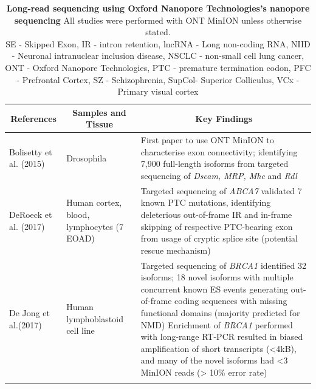 \begin{changemargin}{1.5cm}
\begin{landscape}
		\begin{longtable}[c]{p{4cm}p{4cm}p{18cm}}
			\caption[Long-read sequencing using Oxford Nanopore Technologies's nanopore sequencing]%
			{\textbf{Long-read sequencing using Oxford Nanopore Technologies's nanopore sequencing} All studies were performed with ONT MinION unless otherwise stated. \newline SE - Skipped Exon, IR - intron retention, lncRNA - Long non-coding RNA, NIID - Neuronal intranuclear inclusion disease, NSCLC - non-small cell lung cancer, ONT - Oxford Nanopore Technologies, PTC - premature termination codon, PFC - Prefrontal Cortex, SZ - Schizophrenia, SupCol- Superior Colliculus, VCx - Primary visual cortex}
			\label{tab: longread_ontstudies}\\
			
			\toprule
			\multicolumn{1}{c}{References} &
			\multicolumn{1}{c}{Samples and Tissue} &
			\multicolumn{1}{c}{Key Findings} \\* \midrule
			\endfirsthead
			\endhead
			\bottomrule
			\endfoot
			\endlastfoot
			\centering Bolisetty et al. (2015)\cite{Bolisetty2015} &
			\centering Drosophila &
			\tabitem First paper to use ONT MinION to characterise exon connectivity; identifying 7,900 full-length isoforms from targeted sequencing of \textit{Dscam, MRP, Mhc} and \textit{Rdl}  \\
			\hdashline[0.5pt/5pt]
			
			\centering DeRoeck et al. (2017)\cite{DeRoeck2017}  &
			\centering Human cortex, blood, lymphocytes (7 EOAD) &
			\tabitem Targeted sequencing of \textit{ABCA7} validated 7 known PTC mutations, identifying deleterious out-of-frame IR and in-frame skipping of respective PTC-bearing exon from usage of cryptic splice site (potential rescue mechanism) \\
			\hdashline[0.5pt/5pt]
			
			\centering De Jong et al.(2017)\cite{DeJong2017}  &
			\centering Human lymphoblastoid cell line &
			\tabitem Targeted sequencing of \textit{BRCA1} identified 32 isoforms; 18 novel isoforms with multiple concurrent known ES events generating out-of-frame coding sequences with missing functional domains (majority predicted for NMD) \newline
			\tabitem Enrichment of \textit{BRCA1} performed with long-range RT-PCR resulted in biased amplification of short transcripts (<4kB), and many of the novel isoforms had <3 MinION reads (> 10\% error rate)  \\
			\hdashline[0.5pt/5pt]
			

\end{longtable}
\end{landscape}
\end{changemargin}
